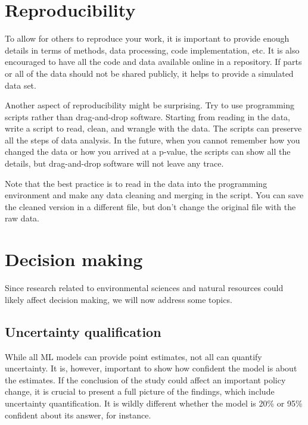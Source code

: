 \documentclass[
]{book}
\begin{document}
\hypertarget{reproducibility}{%
\section{Reproducibility}\label{reproducibility}}

To allow for others to reproduce your work, it is important to provide enough details in terms of methods, data processing, code implementation, etc. It is also encouraged to have all the code and data available online in a repository. If parts or all of the data should not be shared publicly, it helps to provide a simulated data set.

Another aspect of reproducibility might be surprising. Try to use programming scripts rather than drag-and-drop software. Starting from reading in the data, write a script to read, clean, and wrangle with the data. The scripts can preserve all the steps of data analysis. In the future, when you cannot remember how you changed the data or how you arrived at a p-value, the scripts can show all the details, but drag-and-drop software will not leave any trace.

Note that the best practice is to read in the data into the programming environment and make any data cleaning and merging in the script. You can save the cleaned version in a different file, but don't change the original file with the raw data.

\hypertarget{decision-making}{%
\section{Decision making}\label{decision-making}}

Since research related to environmental sciences and natural resources could likely affect decision making, we will now address some topics.

\hypertarget{uncertainty-qualification}{%
\subsection{Uncertainty qualification}\label{uncertainty-qualification}}

While all ML models can provide point estimates, not all can quantify uncertainty. It is, however, important to show how confident the model is about the estimates. If the conclusion of the study could affect an important policy change, it is crucial to present a full picture of the findings, which include uncertainty quantification. It is wildly different whether the model is 20\% or 95\% confident about its answer, for instance.
\end{document}
